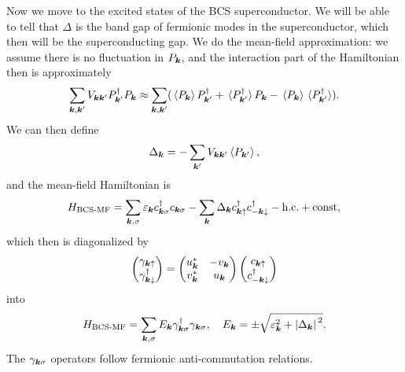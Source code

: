 \documentclass[hyperref, a4paper]{article}
\newcommand*{\const}{\mathrm{const}}
\begin{document}
Now we move to the excited states of the BCS superconductor.
We will be able to tell that $\Delta$ is the band gap
of fermionic modes in the superconductor,
which then will be the superconducting gap.
We do the mean-field approximation: 
we assume there is no fluctuation in $P_{\vb*{k}}$,
and the interaction part of the Hamiltonian then is approximately
\begin{equation}
    \sum_{\vb*{k}, \vb*{k}'} V_{\vb*{k} \vb*{k}'} P_{\vb*{k}'}^\dagger P_{\vb*{k}}
    \approx \sum_{\vb*{k}, \vb*{k}'} (
        \expval*{P_{\vb*{k}}} P^\dagger_{\vb*{k}'}
        + \expval*{P^\dagger_{\vb*{k}'}} P_{\vb*{k}}
        - \expval*{P_{\vb*{k}}} \expval*{P^\dagger_{\vb*{k}'}}
    ).
\end{equation}
We can then define 
\begin{equation}
    \Delta_{\vb*{k}} = - \sum_{\vb*{k}'} V_{\vb*{k} \vb*{k}'} \expval*{P_{\vb*{k}'}},
\end{equation}
and the mean-field Hamiltonian is 
\begin{equation}
    H_{\text{BCS-MF}} = \sum_{\vb*{k}, \sigma} \varepsilon_{\vb*{k}} c^\dagger_{\vb*{k} \sigma} c_{\vb*{k} \sigma}
    - \sum_{\vb*{k}} \Delta_{\vb*{k}} c^\dagger_{\vb*{k} \uparrow} c^\dagger_{- \vb*{k} \downarrow}
    - \text{h.c.} + \const,
\end{equation}
which then is diagonalized by 
\begin{equation}
    \pmqty{
        \gamma_{\vb*{k} \uparrow} \\ \gamma^\dagger_{\vb*{k} \downarrow}
    } = \pmqty{
        u^*_{\vb*{k}} & - v_{\vb*{k}} \\
        v^*_{\vb*{k}} & u_{\vb*{k}}
    } \pmqty{
        c_{\vb*{k} \uparrow} \\ c^\dagger_{- \vb*{k} \downarrow}
    }
\end{equation}
into 
\begin{equation}
    H_{\text{BCS-MF}} = \sum_{\vb*{k}, \sigma} 
    E_{\vb*{k}} \gamma^\dagger_{\vb*{k} \sigma} \gamma_{\vb*{k} \sigma}, \quad
    E_{\vb*{k}} = \pm \sqrt{\varepsilon_{\vb*{k}}^2 + \abs*{\Delta_{\vb*{k}}}^2}.
\end{equation}
The $\gamma_{\vb*{k} \sigma}$ operators follow fermionic anti-commutation relations.
\end{document}
